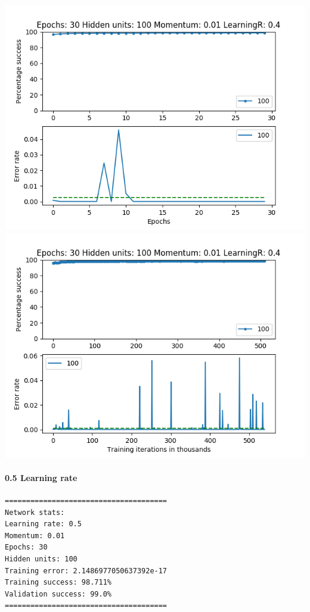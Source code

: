 \documentclass[11pt]{article}
\makeatletter
\def\maxwidth{\ifdim\Gin@nat@width>\linewidth\linewidth
    \else\Gin@nat@width\fi}
\let\Oldincludegraphics\includegraphics
\renewcommand{\includegraphics}[1]{\Oldincludegraphics[width=.8\maxwidth]{#1}}
\makeatother
\begin{document}
\includegraphics{Experiment1/E1_NN_Epoch_Momentum_0.01_30Epochs_100_LR_0.4_Hiddenunits.png}
\includegraphics{Experiment1/E1_NN_Training_Momentum_0.01_30Epochs_100_LR_0.4_Hiddenunits.png}

\hypertarget{learning-rate-4}{%
\paragraph{0.5 Learning rate}\label{learning-rate-4}}

\begin{verbatim}
======================================
Network stats: 
Learning rate: 0.5
Momentum: 0.01
Epochs: 30
Hidden units: 100
Training error: 2.1486977050637392e-17
Training success: 98.711%
Validation success: 99.0%
======================================
\end{verbatim}
\end{document}
